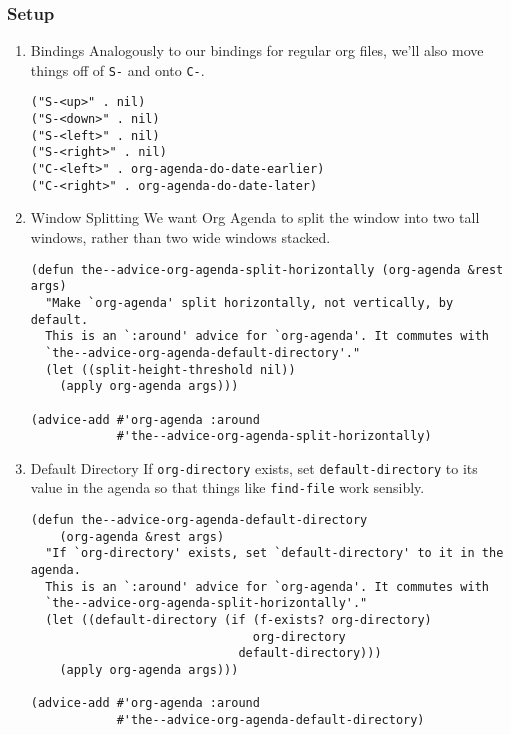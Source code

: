 \documentclass[11pt]{article}
\begin{document}
\subsubsection{Setup}
\label{sec:org0858f07}
\begin{enumerate}
\item Bindings
\label{sec:org77c540c}
Analogously to our bindings for regular org files, we'll also move
things off of \texttt{S-} and onto \texttt{C-}.

\begin{verbatim}
("S-<up>" . nil)
("S-<down>" . nil)
("S-<left>" . nil)
("S-<right>" . nil)
("C-<left>" . org-agenda-do-date-earlier)
("C-<right>" . org-agenda-do-date-later)
\end{verbatim}

\item Window Splitting
\label{sec:org3bf1620}
We want Org Agenda to split the window into two tall windows, rather
than two wide windows stacked.

\begin{verbatim}
(defun the--advice-org-agenda-split-horizontally (org-agenda &rest args)
  "Make `org-agenda' split horizontally, not vertically, by default.
  This is an `:around' advice for `org-agenda'. It commutes with
  `the--advice-org-agenda-default-directory'."
  (let ((split-height-threshold nil))
    (apply org-agenda args)))

(advice-add #'org-agenda :around
            #'the--advice-org-agenda-split-horizontally)
\end{verbatim}

\item Default Directory
\label{sec:orgd4e019d}
If \texttt{org-directory} exists, set \texttt{default-directory} to its value in the
agenda so that things like \texttt{find-file} work sensibly.

\begin{verbatim}
(defun the--advice-org-agenda-default-directory
    (org-agenda &rest args)
  "If `org-directory' exists, set `default-directory' to it in the agenda.
  This is an `:around' advice for `org-agenda'. It commutes with
  `the--advice-org-agenda-split-horizontally'."
  (let ((default-directory (if (f-exists? org-directory)
                               org-directory
                             default-directory)))
    (apply org-agenda args)))

(advice-add #'org-agenda :around
            #'the--advice-org-agenda-default-directory)
\end{verbatim}
\end{enumerate}
\end{document}
